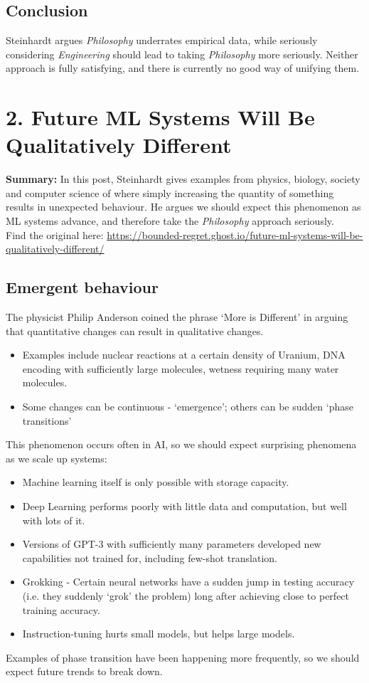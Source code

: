 \documentclass{article}
\begin{document}
\begin{multicols}{2}
\subsection*{Conclusion}
Steinhardt argues \emph{Philosophy} underrates empirical data, while seriously considering \emph{Engineering} should lead to taking \emph{Philosophy} more seriously. Neither approach is fully satisfying, and there is currently no good way of unifying them.

\section*{2. Future ML Systems Will Be Qualitatively Different}
\textbf{Summary:} In this post, Steinhardt gives examples from physics, biology, society and computer science of where simply increasing the quantity of something results in unexpected behaviour. He argues we should expect this phenomenon as ML systems advance, and therefore take the \emph{Philosophy} approach seriously. \\ Find the original here: \href{https://bounded-regret.ghost.io/future-ml-systems-will-be-qualitatively-different/}{https://bounded-regret.ghost.io/future-ml-systems-will-be-qualitatively-different/}

\subsection*{Emergent behaviour}
The physicist Philip Anderson coined the phrase `More is Different' in arguing that quantitative changes can result in qualitative changes.
\begin{itemize}
    \item Examples include nuclear reactions at a certain density of Uranium, DNA encoding with sufficiently large molecules, wetness requiring many water molecules.
    \item Some changes can be continuous - `emergence'; others can be sudden `phase transitions'
\end{itemize}
This phenomenon occurs often in AI, so we should expect surprising phenomena as we scale up systems:
\begin{itemize}
    \item Machine learning itself is only possible with storage capacity.
    \item Deep Learning performs poorly with little data and computation, but well with lots of it.
    \item Versions of GPT-3 with sufficiently many parameters developed new capabilities not trained for, including few-shot translation.
    \item Grokking - Certain neural networks have a sudden jump in testing accuracy (i.e. they suddenly `grok' the problem) long after achieving close to perfect training accuracy.
    \item Instruction-tuning hurts small models, but helps large models.
\end{itemize}
Examples of phase transition have been happening more frequently, so we should expect future trends to break down.


\end{multicols}
\end{document}
